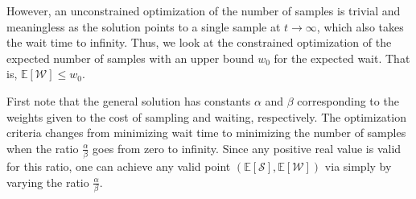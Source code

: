 However, an unconstrained optimization of the number of samples is trivial and meaningless as the solution points to a single sample at $t\!\rightarrow\!\infty$, which also takes the wait time to infinity.
Thus, we look at the constrained optimization of the expected number of samples with an upper bound $w_0$ for the expected wait.
That is, $\mathbb{E}[\mathcal{W}]\!\leq\!w_0$.

First note that the general solution has constants $\alpha$ and $\beta$ corresponding to the weights given to the cost of sampling and waiting, respectively.
The optimization criteria changes from minimizing wait time to minimizing the number of samples when the ratio $\frac{\alpha}{\beta}$ goes from zero to infinity.
Since any positive real value is valid for this ratio, one can achieve any valid point $(\mathbb{E}[\mathcal{S}],\mathbb{E}[\mathcal{W}])$ via simply by varying the ratio $\frac{\alpha}{\beta}$.

